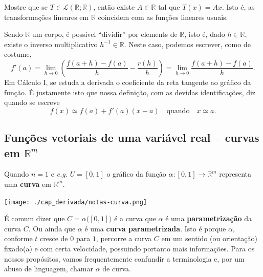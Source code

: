 \begin{exer}
	Mostre que se $T \in \mathcal{L}(\mathbb{R};\mathbb{R})$, então existe $A \in \mathbb{R}$ tal que $T(x) = Ax$. Isto é, as transformações lineares em $\mathbb{R}$ coincidem com as funções lineares usuais.
\end{exer}

Sendo $\mathbb{R}$ um corpo, é possível ``dividir'' por elements de $\mathbb{R}$, isto é, dado $h \in \mathbb{R}$, existe o inverso multiplicativo $h^{-1} \in \mathbb{R}$. Neste caso, podemos escrever, como de costume,
\[
f'(a) = \lim_{h \to 0} \left( \frac{f(a + h) - f(a)}{h} - \frac{r(h)}{h}  \right) = \lim_{h \to 0}  \frac{f(a + h) - f(a)}{h}.
\] Em Cálculo I, se estuda a derivada o coeficiente da reta tangente ao gráfico da função. É justamente isto que nossa definição, com as devidas identificações, diz quando se escreve
\[
f(x) \simeq f(a) + f'(a) (x-a) \quad \text{quando} \quad x \simeq a.
\]

\subsection{Funções vetoriais de uma variável real -- curvas em $\mathbb{R}^m$}

Quando $n = 1$ e \textit{e.g.} $U = [0,1]$ o gráfico da função $\alpha: [0,1] \to \mathbb{R}^m$ representa uma \textbf{curva} em $\mathbb{R}^m$.
\begin{center}
	\texttt{[image: ./cap\_derivada/notas-curva.png]}
\end{center}

É comum dizer que $C = \alpha\big([0,1]\big)$ é a curva que $\alpha$ é uma \textbf{parametrização} da curva $C$. Ou ainda que $\alpha$ é uma \textbf{curva parametrizada}. Isto é porque $\alpha$, conforme $t$ cresce de $0$ para $1$, percorre a curva $C$ em um sentido (ou orientação) fixado(a) e com certa velocidade, possuindo portanto mais informações. Para os nossos propósitos, vamos frequentemente confundir a terminologia e, por um abuso de linguagem, chamar $\alpha$ de curva.

